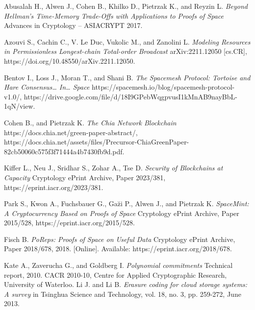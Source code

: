 \documentclass[conference]{IEEEtran}
\begin{document}
\begin{thebibliography}{9}

Abusalah H., Alwen J., Cohen B., Khilko D., Pietrzak K., and Reyzin L.
\emph{Beyond Hellman’s Time-Memory Trade-Offs with Applications to Proofs of Space}
Advances in Cryptology – ASIACRYPT 2017.

Azouvi S., Cachin C., V. Le Duc, Vukolic M., and Zanolini L.
\emph{Modeling Resources in Permissionless Longest-chain Total-order Broadcast}
arXiv:2211.12050 [cs.CR],
https://doi.org/10.48550/arXiv.2211.12050.

Bentov I., Loss J., Moran T., and Shani B.
\emph{The Spacemesh Protocol: Tortoise and Hare Consensus… In… Space}
https://spacemesh.io/blog/spacemesh-protocol-v1.0/,
https://drive.google.com/file/d/18I9GPebWqgpvusI1kMnAB9nayBbL-1qN/view.

Cohen B., and Pietrzak K.
\emph{The Chia Network Blockchain}
https://docs.chia.net/green-paper-abstract/,
https://docs.chia.net/assets/files/Precursor-ChiaGreenPaper-82cb50060c575f3f71444a4b7430fb9d.pdf.

Kiffer L., Neu J., Sridhar S., Zohar A., Tse D.
\emph{Security of Blockchains at Capacity}
Cryptology ePrint Archive, Paper 2023/381,
https://eprint.iacr.org/2023/381.

Park S., Kwon A., Fuchsbauer G., Ga\u{z}i P., Alwen J., and Pietrzak K.
\emph{SpaceMint: A Cryptocurrency Based on Proofs of Space}
Cryptology ePrint Archive, Paper 2015/528,
https://eprint.iacr.org/2015/528.

Fisch B. \emph{PoReps: Proofs of Space on Useful Data} Cryptology ePrint Archive, Paper 2018/678, 2018. [Online]. Available: https://eprint.iacr.org/2018/678.

Kate A., Zaverucha G., and Goldberg I.  \emph{Polynomial commitments} Technical report, 2010. CACR 2010-10, Centre for Applied Cryptographic Research, University of Waterloo.
Li J. and Li  B. \emph{Erasure coding for cloud storage systems: A survey} in Tsinghua Science and Technology, vol. 18, no. 3, pp. 259-272, June 2013.



\end{thebibliography}
\end{document}
